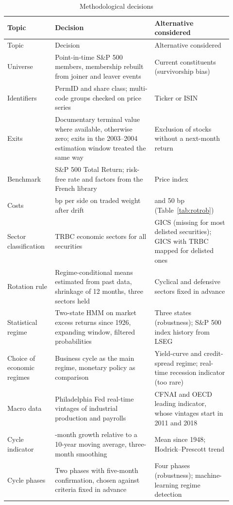 \documentclass[11pt,a4paper]{article}
\begin{document}
{\small
\begin{longtable}{>{\raggedright\arraybackslash}p{0.19\linewidth}>{\raggedright\arraybackslash}p{0.41\linewidth}>{\raggedright\arraybackslash}p{0.32\linewidth}}
\caption{Methodological decisions}\label{tab:log}\\
\toprule
Topic & Decision & Alternative considered \\
\midrule
\endfirsthead
\toprule
Topic & Decision & Alternative considered \\
\midrule
\endhead
\bottomrule
\endfoot
Universe & Point-in-time S\&P 500 members, membership rebuilt from joiner and leaver events & Current constituents (survivorship bias) \\
Identifiers & PermID and share class; multi-code groups checked on price series & Ticker or ISIN \\
Exits & Documentary terminal value where available, otherwise zero; exits in the 2003--2004 estimation window treated the same way & Exclusion of stocks without a next-month return \\
Benchmark & S\&P 500 Total Return; risk-free rate and factors from the French library & Price index \\
Costs & 10 bp per side on traded weight after drift & 25 and 50 bp (Table~\ref{tab:rotrob}) \\
Sector classification & TRBC economic sectors for all securities & GICS (missing for most delisted securities); GICS with TRBC mapped for delisted ones \\
Rotation rule & Regime-conditional means estimated from past data, shrinkage of 12 months, three sectors held & Cyclical and defensive sectors fixed in advance \\
Statistical regime & Two-state HMM on market excess returns since 1926, expanding window, filtered probabilities & Three states (robustness); S\&P 500 index history from LSEG \\
Choice of economic regimes & Business cycle as the main regime, monetary policy as comparison & Yield-curve and credit-spread regime; real-time recession indicator (too rare) \\
Macro data & Philadelphia Fed real-time vintages of industrial production and payrolls & CFNAI and OECD leading indicator, whose vintages start in 2011 and 2018 \\
Cycle indicator & 12-month growth relative to a 10-year moving average, three-month smoothing & Mean since 1948; Hodrick--Prescott trend \\
Cycle phases & Two phases with five-month confirmation, chosen against criteria fixed in advance & Four phases (robustness); machine-learning regime detection \\

\end{longtable}}
\end{document}
